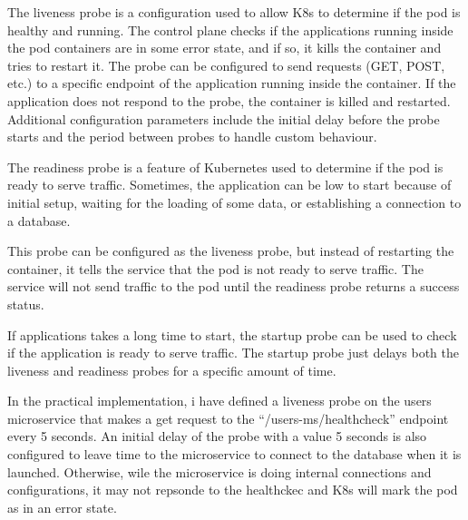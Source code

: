 \documentclass[sigplan,screen]{acmart}
\begin{document}
The liveness probe is a configuration used to allow K8s to determine if the pod is healthy and running. The control plane checks if the applications running inside the pod containers are in some error state, and if so, it kills the container and tries to restart it. The probe can be configured to send requests (GET, POST, etc.) to a specific endpoint of the application running inside the container. If the application does not respond to the probe, the container is killed and restarted. Additional configuration parameters include the initial delay before the probe starts and the period between probes to handle custom behaviour.

The readiness probe is a feature of Kubernetes used to determine if the pod is ready to serve traffic. Sometimes, the application can be low to start because of initial setup, waiting for the loading of some data, or establishing a connection to a database.

This probe can be configured as the liveness probe, but instead of restarting the container, it tells the service that the pod is not ready to serve traffic. The service will not send traffic to the pod until the readiness probe returns a success status.

If applications takes a long time to start, the startup probe can be used to check if the application is ready to serve traffic. The startup probe just delays both the liveness and readiness probes for a specific amount of time.

In the practical implementation, i have defined a liveness probe on the users microservice that makes a get request to the “/users-ms/healthcheck” endpoint every 5 seconds. An initial delay of the probe with a value 5 seconds is also configured to leave time to the microservice to connect to the database when it is launched. Otherwise, wile the microservice is doing internal connections and configurations, it may not repsonde to the healthckec and K8s will mark the pod as in an error state.
\end{document}

